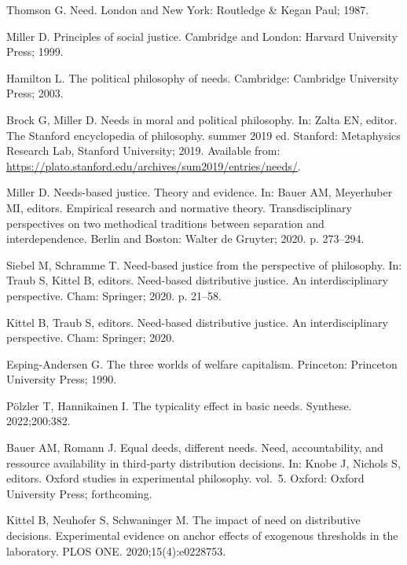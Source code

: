 \documentclass[10pt,letterpaper]{article}
\begin{document}
\begin{thebibliography}{100}
Thomson G.
\newblock Need.
\newblock London and New York: Routledge \& Kegan Paul; 1987.

Miller D.
\newblock Principles of social justice.
\newblock Cambridge and London: Harvard University Press; 1999.

Hamilton L.
\newblock The political philosophy of needs.
\newblock Cambridge: Cambridge University Press; 2003.

Brock G, Miller D.
\newblock Needs in moral and political philosophy.
\newblock In: Zalta EN, editor. The {Stanford} encyclopedia of philosophy.
  summer 2019 ed. Stanford: Metaphysics Research Lab, Stanford University;
  2019. Available from:
  \url{https://plato.stanford.edu/archives/sum2019/entries/needs/}.

Miller D.
\newblock Needs-based justice. {Theory} and evidence.
\newblock In: Bauer AM, Meyerhuber MI, editors. Empirical research and
  normative theory. {Transdisciplinary} perspectives on two methodical
  traditions between separation and interdependence. Berlin and Boston: Walter
  de Gruyter; 2020. p. 273--294.

Siebel M, Schramme T.
\newblock Need-based justice from the perspective of philosophy.
\newblock In: Traub S, Kittel B, editors. Need-based distributive justice. {An}
  interdisciplinary perspective. Cham: Springer; 2020. p. 21--58.

Kittel B, Traub S, editors.
\newblock Need-based distributive justice. {An} interdisciplinary perspective.
\newblock Cham: Springer; 2020.

Esping-Andersen G.
\newblock The three worlds of welfare capitalism.
\newblock Princeton: Princeton University Press; 1990.

Pölzler T, Hannikainen I.
\newblock The typicality effect in basic needs.
\newblock Synthese. 2022;200:382.

Bauer AM, Romann J.
\newblock Equal deeds, different needs. {Need}, accountability, and ressource
  availability in third-party distribution decisions.
\newblock In: Knobe J, Nichols S, editors. Oxford studies in experimental
  philosophy. vol.~5. Oxford: Oxford University Press; forthcoming.

Kittel B, Neuhofer S, Schwaninger M.
\newblock The impact of need on distributive decisions. {Experimental} evidence
  on anchor effects of exogenous thresholds in the laboratory.
\newblock PLOS ONE. 2020;15(4):e0228753.


\end{thebibliography}
\end{document}
